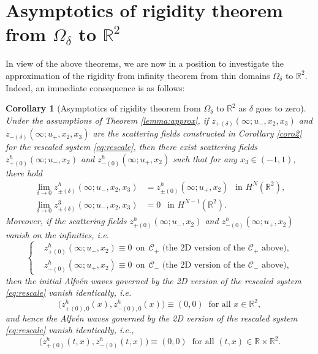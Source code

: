\documentclass[10pt,reqno]{amsart}
\numberwithin{equation}{section}
\newtheorem{corollary}[theorem]{Corollary}
\begin{document}
 


\section{Asymptotics of rigidity theorem from $\Omega_{\delta}$ to $\mathbb{R}^2$}\label{sec:approximation}

 

In view of the above theorems, we are now in a position to investigate the approximation of the rigidity from infinity theorem from thin domains $\Omega_{\delta}$ to $\mathbb{R}^2$. Indeed, an immediate consequence is as follows:


\begin{corollary}[Asymptotics of rigidity theorem from $\Omega_{\delta}$ to $\mathbb{R}^2$ as   $\delta$ goes to zero]\label{thm3}
Under the assumptions of Theorem \ref{lemma:approx}, if  $z_{+(\delta)}(\infty;u_-,x_2,x_3)$ and $z_{-(\delta)}(\infty;u_+,x_2,x_3)$ are the scattering fields constructed in Corollary \ref{coro2} for the rescaled system \eqref{eq:rescale}, then there exist scattering fields  $z_{+(0)}^h(\infty;u_-,x_2)$ and $z_{-(0)}^h(\infty;u_+,x_2)$ such that for any $x_3\in(-1,1)$, there hold
\begin{equation}\label{eq:approx}
	\begin{split}
		\lim_{\delta\to 0}z_{\pm(\delta)}^h(\infty;u_-,x_2,x_3)&=z_{\pm(0)}^h(\infty;u_+,x_2)\ \ \text{ in }H^N(\mathbb{R}^2),\\
		\lim_{\delta\to 0}z_{\pm(\delta)}^3(\infty;u_-,x_2,x_3)&=0\ \ \text{ in }H^{N-1}(\mathbb{R}^2).
\end{split}\end{equation}
Moreover,	if the scattering fields  $z_{+(0)}^h(\infty;u_-,x_2)$ and $z_{-(0)}^h(\infty;u_+,x_2)$
vanish on the infinities, i.e.
\[\begin{cases}
	&z^h_{+(0)}(\infty;u_-,x_2)\equiv 0 \ \ \text{on} \ \ \mathcal{C}_+ \text{ (the 2D version of the $\mathcal{C}_+$ above)},\\
	&z^h_{-(0)}(\infty;u_+,x_2)\equiv 0 \ \ \text{on} \ \ \mathcal{C}_- \text{ (the 2D version of the $\mathcal{C}_-$ above)},
\end{cases}
\]
then the initial Alfv\'en waves governed by the 2D version of the rescaled system  \eqref{eq:rescale} vanish identically, i.e.  \[\big(z^h_{+(0),0}(x),z^h_{-(0),0}(x)\big)\equiv(0,0)\ \text{ for all }x\in\mathbb{R}^2,\] and hence
the Alfv\'en waves governed by the 2D version of the rescaled system  \eqref{eq:rescale}  vanish identically, i.e.,  \[\big(z^h_{+(0)}(t,x),z^h_{-(0)}(t,x)\big)\equiv(0,0)\  \text{ for all }(t,x)\in \mathbb{R}\times \mathbb{R}^2.\] 
\end{corollary}
\end{document}
